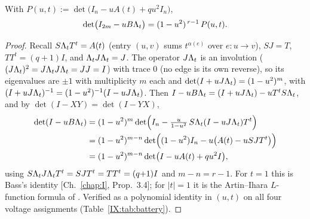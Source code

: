 \begin{theorem}\label{IX:thm:bass}
With $P(u,t):=\det\bigl(I_n-uA(t)+qu^{2}I_n\bigr)$,
\[
\det\bigl(I_{2m}-uB\Lambda_t\bigr)=(1-u^{2})^{\,r-1}\,P(u,t) .
\]
\end{theorem}

\begin{proof}
Recall $S\Lambda_tT^{t}=A(t)$ (entry $(u,v)$ sums $t^{\alpha(e)}$ over $e\colon u\to v$),
$SJ=T$, $TT^{t}=(q{+}1)I$, and $\Lambda_tJ\Lambda_t=J$. The operator $J\Lambda_t$ is an involution
($(J\Lambda_t)^{2}=J\Lambda_tJ\Lambda_t=JJ=I$) with trace $0$ (no edge is its own reverse), so its
eigenvalues are $\pm1$ with multiplicity $m$ each and
$\det(I+uJ\Lambda_t)=(1-u^{2})^{m}$, with $(I+uJ\Lambda_t)^{-1}=(1-u^{2})^{-1}(I-uJ\Lambda_t)$.
Then $I-uB\Lambda_t=(I+uJ\Lambda_t)-uT^{t}S\Lambda_t$, and by $\det(I-XY)=\det(I-YX)$,
\begin{align*}
\det(I-uB\Lambda_t)
&=(1-u^{2})^{m}\det\Bigl(I_n-\tfrac{u}{1-u^{2}}\,S\Lambda_t(I-uJ\Lambda_t)T^{t}\Bigr)\\
&=(1-u^{2})^{m-n}\det\Bigl((1-u^{2})I_n-u\bigl(A(t)-uSJT^{t}\bigr)\Bigr)\\
&=(1-u^{2})^{m-n}\det\bigl(I-uA(t)+qu^{2}I\bigr),
\end{align*}
using $S\Lambda_tJ\Lambda_tT^{t}=SJT^{t}=TT^{t}=(q{+}1)I$ and $m-n=r-1$. For $t=1$ this is
Bass's identity [Ch.~\ref{chap:I}, Prop.~3.4]; for $|t|=1$ it is the Artin--Ihara $L$-function formula
of \cite{ST}. Verified as a polynomial identity in $(u,t)$ on all four voltage
assignments (Table~\ref{IX:tab:battery}).
\end{proof}

